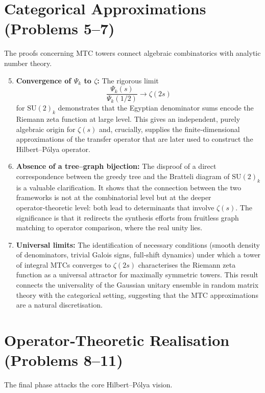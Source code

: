 \documentclass[11pt,a4paper]{article}
\theoremstyle{remark}
\begin{document}
\section{Categorical Approximations (Problems 5--7)}
The proofs concerning MTC towers connect algebraic combinatorics with analytic number theory.

\begin{enumerate}[label=\textbf{P\arabic*:}]
\setcounter{enumi}{4}
\item \textbf{Convergence of $\Psi_k$ to $\zeta$:} The rigorous limit 
\[
\frac{\Psi_k(s)}{\Psi_k(1/2)}\longrightarrow\zeta(2s)
\]
for $\mathrm{SU}(2)_k$ demonstrates that the Egyptian denominator sums encode the Riemann zeta function at large level. This gives an independent, purely algebraic origin for $\zeta(s)$ and, crucially, supplies the finite‑dimensional approximations of the transfer operator that are later used to construct the Hilbert--Pólya operator.

\item \textbf{Absence of a tree--graph bijection:} The disproof of a direct correspondence between the greedy tree and the Bratteli diagram of $\mathrm{SU}(2)_k$ is a valuable clarification. It shows that the connection between the two frameworks is not at the combinatorial level but at the deeper operator‑theoretic level: both lead to determinants that involve $\zeta(s)$. The significance is that it redirects the synthesis efforts from fruitless graph matching to operator comparison, where the real unity lies.

\item \textbf{Universal limits:} The identification of necessary conditions (smooth density of denominators, trivial Galois signs, full‑shift dynamics) under which a tower of integral MTCs converges to $\zeta(2s)$ characterises the Riemann zeta function as a universal attractor for maximally symmetric towers. This result connects the universality of the Gaussian unitary ensemble in random matrix theory with the categorical setting, suggesting that the MTC approximations are a natural discretisation.
\end{enumerate}

\section{Operator‑Theoretic Realisation (Problems 8--11)}
The final phase attacks the core Hilbert--Pólya vision.
\end{document}
